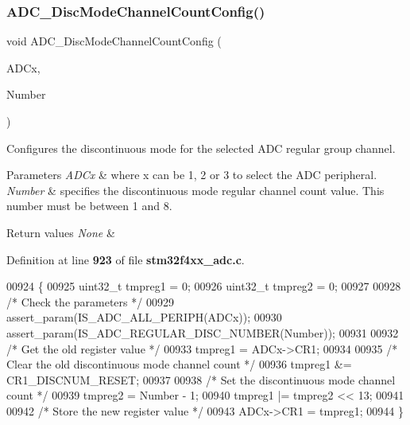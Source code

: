 \subsubsection{A\+D\+C\+\_\+\+Disc\+Mode\+Channel\+Count\+Config()}
{\footnotesize\ttfamily void A\+D\+C\+\_\+\+Disc\+Mode\+Channel\+Count\+Config (\begin{DoxyParamCaption}\item[{\textbf{ A\+D\+C\+\_\+\+Type\+Def} $\ast$}]{A\+D\+Cx,  }\item[{uint8\+\_\+t}]{Number }\end{DoxyParamCaption})}



Configures the discontinuous mode for the selected A\+DC regular group channel. 


\begin{DoxyParams}{Parameters}
{\em A\+D\+Cx} & where x can be 1, 2 or 3 to select the A\+DC peripheral. \\
\hline
{\em Number} & specifies the discontinuous mode regular channel count value. This number must be between 1 and 8. \\
\hline
\end{DoxyParams}

\begin{DoxyRetVals}{Return values}
{\em None} & \\
\hline
\end{DoxyRetVals}


Definition at line \textbf{ 923} of file \textbf{ stm32f4xx\+\_\+adc.\+c}.


\begin{DoxyCode}
00924 \{
00925   uint32\_t tmpreg1 = 0;
00926   uint32\_t tmpreg2 = 0;
00927   
00928   \textcolor{comment}{/* Check the parameters */}
00929   assert_param(IS_ADC_ALL_PERIPH(ADCx));
00930   assert_param(IS_ADC_REGULAR_DISC_NUMBER(Number));
00931   
00932   \textcolor{comment}{/* Get the old register value */}
00933   tmpreg1 = ADCx->CR1;
00934   
00935   \textcolor{comment}{/* Clear the old discontinuous mode channel count */}
00936   tmpreg1 &= CR1_DISCNUM_RESET;
00937   
00938   \textcolor{comment}{/* Set the discontinuous mode channel count */}
00939   tmpreg2 = Number - 1;
00940   tmpreg1 |= tmpreg2 << 13;
00941   
00942   \textcolor{comment}{/* Store the new register value */}
00943   ADCx->CR1 = tmpreg1;
00944 \}
\end{DoxyCode}
\mbox{\label{group__ADC__Group4_ga1909649d10253ce88d986ffbb94a4be6}} 
